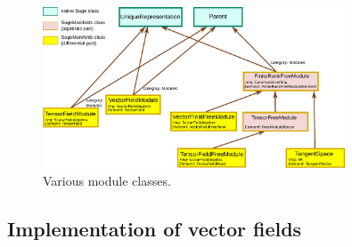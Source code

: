 \documentclass[a4paper]{jpconf}
\begin{document}
\begin{figure}
\begin{center}
\includegraphics[width=0.8\textwidth]{module_classes.pdf}
\end{center}
\caption{\label{f:module_classes} Various module classes.}
\end{figure}



\subsection{Implementation of vector fields}
\end{document}
